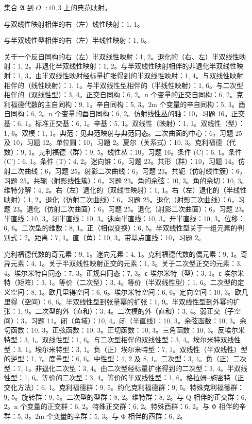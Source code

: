 集合 \(\mathfrak{A}\) 到 \(O^{+}:10,3\) 上的典范映射。

与双线性映射相伴的右（左）线性映射：1, 1。

与半双线性型相伴的右（左）半线性映射：1, 6。

关于一个反自同构的右（左）半双线性映射：1, 2。退化的（右、左）半双线性映射：1, 2。非退化半双线性映射：1, 2。与半双线性映射相伴的非退化半双线性映射：1, 3。由半双线性映射经标量扩张得到的半双线性映射：1, 4。与双线性映射相伴的（线性映射）：1, 1。与半双线性型相伴的（半线性映射）：1, 6。与二次型相伴的（双线性型）：3, 4。正交自同构：6, 2。n 个变量的正交自同构：6, 2。克利福德代数的主自同构：9, 1。辛自同构：5, 3。2m 个变量的辛自同构：5, 3。酉自同构：6, 2。n 个变量的酉自同构：6, 2。仿射线性丛的轴：10，习题 16。正交基：6, 1。标准正交基：6, 1。辛基：5, 1。双线性（映射）：1, 1。双线性（型）：1, 6。双模：1, 1。典范：见典范映射与典范同态。二次曲面的中心：6，习题 25 及 10，习题 12。单位圆：10，习题 2。夏尔（关系式）：10, 3。克利福德（代数）：9, 1。克利福德（群）：9, 5。线性丛：10，习题 16。条件 (C)：6, 1。条件 (C′)：6, 1。条件 (T)：4, 2。迷向锥：6，习题 23。共形（群）：10，习题 14。仿射二次曲线：6，习题 25。射影二次曲线：6，习题 23。共轭（仿射线性簇）：6，习题 25。共轭（射影线性簇）：6，习题 23。角的余弦：10, 3。角的余切：10, 3。维特分解：4, 2。右（左）退化的（双线性映射）：1, 1。右（左）退化的（半线性映射）：1, 2。退化（仿射二次曲线）：6，习题 25。退化（射影二次曲线）：6，习题 23。退化（仿射二次曲面）：6，习题 25。退化（射影二次曲面）：6，习题 23。半直线：10, 3。闭半直线：10, 3。迷向半直线：10, 3。开半直线：10, 3。位移：6, 6。二次型的维数：8, 1。正（相似变换）：6, 5。半双线性型关于一组元素的判别式：2。距离：7, 1。直（角）：10, 3。带基点直线：10，习题 2。

克利福德代数的奇元素：9, 1。迷向元素：4, 1。克利福德代数的偶元素：9, 1。奇异元素：4, 1。关于半双线性映射正交的元素：1, 3。关于二次型正交的元素：3, 4。埃尔米特自同态：7, 3。正规自同态：7, 3。ε-埃尔米特（型）：3, 1。ε-埃尔米特（矩阵）：3, 1。等价（二次型）：3, 4。等价（半双线性型）：1, 6。二次型的定义空间：8, 1。欧几里得空间：6, 6。埃尔米特空间：6, 6。定向空间：10, 3。欧几里得（空间）：6, 6。半双线性型到张量幂的扩张：1, 9。半双线性型到外幂的扩张：1, 9。二次型的外（直和）：3, 4。二次模的外（直和）：3, 4。弱正交（子空间）：3，习题 11。闭（角域）：10, 4。闭（半直线）：10, 3。余弦函数：10, 3。余切函数：10, 3。正弦函数：10, 3。正切函数：10, 3。三角函数：10, 3。反埃尔米特型：3, 1。双线性型：1, 6。与二次型相伴的双线性型：3, 4。埃尔米特双线性型：3, 1。埃尔米特型：3, 1。负（正）埃尔米特型：7, 1。双线性（半双线性）型的逆型：1, 7。度量型：6, 6。中性型：4, 2 及 8, 1。二次型：3, 4。负（正）二次型：7, 1。非退化二次型：3, 4。由二次型经标量扩张得到的二次型：3, 4。半双线性型：1, 6。等价的二次型：3, 4。等价的半双线性型：1, 6。格拉姆–施密特（正交化方法）：6, 1。克利福德群：9, 5。约化克利福德群：9, 5。特殊克利福德群：9, 5。旋转群：9, 5。二次型的型群：8, 2。维特群：8, 2。与 Q 相伴的正交群：6, 2。n 个变量的正交群：6, 2。特殊正交群：6, 2。特殊酉群：6, 2。与 Φ 相伴的辛群：5, 3。2m 个变量的辛群：5, 3。与 Φ 相伴的酉群：6, 2。

